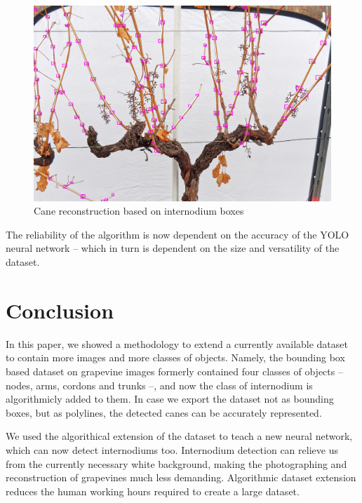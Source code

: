 \documentclass{PSAIE}%
\begin{document}
\begin{figure}[h]
      \centering
      \includegraphics[scale=0.23]{images/internodium_connections.png}
      \caption{Cane reconstruction based on internodium boxes}
      \label{fig_internodium_connections}
\end{figure}

The reliability of the algorithm is now dependent on the accuracy of the YOLO neural network -- which in
turn is dependent on the size and versatility of the dataset.

\section{Conclusion} \label{sec_conclusion}
In this paper, we showed a methodology to extend a currently available dataset to contain more images and
more classes of objects. Namely, the bounding box based dataset on grapevine images formerly contained
four classes of objects -- nodes, arms, cordons and trunks --, and now the class of internodium is
algorithmicly added to them. In case we export the dataset not as bounding boxes, but as polylines,
the detected canes can be accurately represented.

We used the algorithical extension of the dataset to teach a new neural network, which can now detect
internodiums too. Internodium detection can relieve us from the currently necessary white background,
making the photographing and reconstruction of grapevines much less demanding. Algorithmic dataset
extension reduces the human working hours required to create a large dataset.



\end{document}
